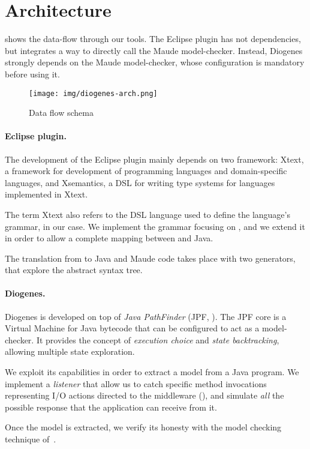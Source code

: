 \section{Architecture}

 shows the data-flow through our tools.
The Eclipse plugin has not dependencies,
but integrates a way to directly call the Maude model-checker.
%
Instead, Diogenes strongly depends on
the Maude model-checker, whose configuration is mandatory before using it.


\begin{figure}
    \texttt{[image: img/diogenes-arch.png]}
    \caption{Data flow schema}
    \label{fig:data-flow}
\end{figure}

\paragraph{Eclipse plugin.}
The development of the Eclipse plugin mainly depends on
two framework: Xtext\cite{xtext-site}, a framework for 
development of programming languages and domain-specific languages, and
Xsemantics\cite{xsemantics-site}, a DSL for writing type systems
for languages implemented in Xtext.

The term Xtext also refers to the DSL language
used to define the language's grammar, \coco in our case.
We implement the grammar focusing on \cite{verifiable},
and we extend it
in order to allow a complete mapping between \coco and Java.

The translation from \coco to Java and Maude code
takes place with two generators, that explore the abstract syntax tree. 

\paragraph{Diogenes.}
Diogenes is developed on top of \emph{Java PathFinder}
(JPF, \cite{lerda2001addressing,visser2003model}).
The JPF core is a Virtual Machine for Java bytecode
that can be configured to act as a model-checker.
It provides the concept of \emph{execution choice}
and \emph{state backtracking}, allowing multiple state exploration.

We exploit its capabilities in order to extract a \coco model
from a Java program. We implement a \emph{listener} that allow us
to catch specific method invocations representing I/O actions
directed to the middleware (\cite{CO2middleware}),
and simulate \emph{all} the possible response that 
the application can receive from it.

Once the \coco model is extracted, we verify its honesty
with the model checking technique of~\cite{verifiable}.

